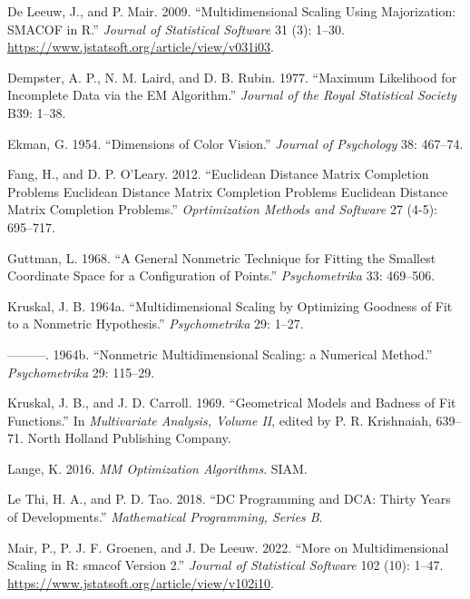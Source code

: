 \documentclass[
  12pt,
]{article}
\newlength{\cslhangindent}
\newenvironment{CSLReferences}[2] %
 {\begin{list}{}{%
  \setlength{\itemindent}{0pt}
  \setlength{\leftmargin}{0pt}
  \setlength{\parsep}{0pt}
  \ifodd #1
   \setlength{\leftmargin}{\cslhangindent}
   \setlength{\itemindent}{-1\cslhangindent}
  \fi
  \setlength{\itemsep}{#2\baselineskip}}}
 {\end{list}}
\begin{document}
\begin{CSLReferences}{1}{0}
De Leeuw, J., and P. Mair. 2009. {``{Multidimensional Scaling Using Majorization: SMACOF in R}.''} \emph{Journal of Statistical Software} 31 (3): 1--30. \url{https://www.jstatsoft.org/article/view/v031i03}.

Dempster, A. P., N. M. Laird, and D. B. Rubin. 1977. {``{Maximum Likelihood for Incomplete Data via the EM Algorithm}.''} \emph{Journal of the Royal Statistical Society} B39: 1--38.

Ekman, G. 1954. {``{Dimensions of Color Vision}.''} \emph{Journal of Psychology} 38: 467--74.

Fang, H., and D. P. O'Leary. 2012. {``Euclidean Distance Matrix Completion Problems Euclidean Distance Matrix Completion Problems Euclidean Distance Matrix Completion Problems.''} \emph{Oprtimization Methods and Software} 27 (4-5): 695--717.

Guttman, L. 1968. {``{A General Nonmetric Technique for Fitting the Smallest Coordinate Space for a Configuration of Points}.''} \emph{Psychometrika} 33: 469--506.

Kruskal, J. B. 1964a. {``{Multidimensional Scaling by Optimizing Goodness of Fit to a Nonmetric Hypothesis}.''} \emph{Psychometrika} 29: 1--27.

---------. 1964b. {``{Nonmetric Multidimensional Scaling: a Numerical Method}.''} \emph{Psychometrika} 29: 115--29.

Kruskal, J. B., and J. D. Carroll. 1969. {``{Geometrical Models and Badness of Fit Functions}.''} In \emph{Multivariate Analysis, Volume II}, edited by P. R. Krishnaiah, 639--71. North Holland Publishing Company.

Lange, K. 2016. \emph{MM Optimization Algorithms}. SIAM.

Le Thi, H. A., and P. D. Tao. 2018. {``{DC Programming and DCA: Thirty Years of Developments}.''} \emph{Mathematical Programming, Series B}.

Mair, P., P. J. F. Groenen, and J. De Leeuw. 2022. {``{More on Multidimensional Scaling in R: smacof Version 2}.''} \emph{Journal of Statistical Software} 102 (10): 1--47. \url{https://www.jstatsoft.org/article/view/v102i10}.


\end{CSLReferences}
\end{document}
